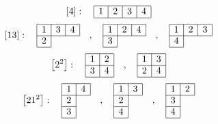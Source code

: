 \documentclass[fleqn]{article}%
\begin{document}
%
\vspace{0.25cm}%
\begin{dmath*}\left[4\right]:\quad\begin{array}{|c|c|c|c|} \hline 1 & 2 & 3 & 4\\ \cline{1-4} \end{array} \end{dmath*}%
\vspace{0.25cm}%
\begin{dmath*}\left[13\right]:\quad\begin{array}{|c|c|c|} \hline 1 & 3 & 4\\ \cline{1-3} 2\\ \cline{1-1} \end{array} \quad , \quad \begin{array}{|c|c|c|} \hline 1 & 2 & 4\\ \cline{1-3} 3\\ \cline{1-1} \end{array} \quad , \quad \begin{array}{|c|c|c|} \hline 1 & 2 & 3\\ \cline{1-3} 4\\ \cline{1-1} \end{array} \end{dmath*}%
\vspace{0.25cm}%
\begin{dmath*}\left[2^2\right]:\quad\begin{array}{|c|c|} \hline 1 & 2\\ \cline{1-2} 3 & 4\\ \cline{1-2} \end{array} \quad , \quad \begin{array}{|c|c|} \hline 1 & 3\\ \cline{1-2} 2 & 4\\ \cline{1-2} \end{array} \end{dmath*}%
\vspace{0.25cm}%
\begin{dmath*}\left[21^2\right]:\quad\begin{array}{|c|c|} \hline 1 & 4\\ \cline{1-2} 2\\ \cline{1-1} 3\\ \cline{1-1} \end{array} \quad , \quad \begin{array}{|c|c|} \hline 1 & 3\\ \cline{1-2} 2\\ \cline{1-1} 4\\ \cline{1-1} \end{array} \quad , \quad \begin{array}{|c|c|} \hline 1 & 2\\ \cline{1-2} 3\\ \cline{1-1} 4\\ \cline{1-1} \end{array} \end{dmath*}%
\end{document}
